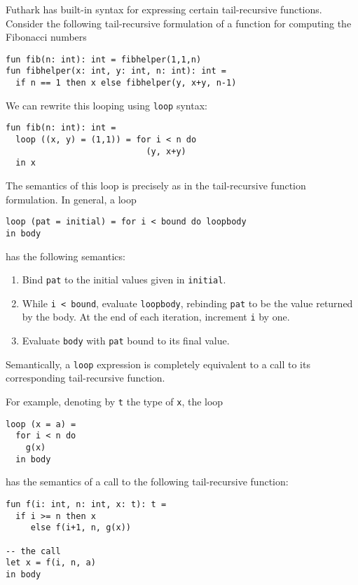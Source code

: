 \documentclass[oneside,11pt]{book}
\begin{document}
Futhark has built-in syntax for expressing certain tail-recursive
functions.  Consider the following tail-recursive formulation of a
function for computing the Fibonacci numbers

\begin{lstlisting}
fun fib(n: int): int = fibhelper(1,1,n)
fun fibhelper(x: int, y: int, n: int): int =
  if n == 1 then x else fibhelper(y, x+y, n-1)
\end{lstlisting}

We can rewrite this looping using \texttt{loop} syntax:

\begin{lstlisting}
fun fib(n: int): int =
  loop ((x, y) = (1,1)) = for i < n do
                            (y, x+y)
  in x
\end{lstlisting}

The semantics of this loop is precisely as in the tail-recursive function
formulation.  In general, a loop

\begin{lstlisting}
loop (pat = initial) = for i < bound do loopbody
in body
\end{lstlisting}

\noindent
has the following semantics:

\begin{enumerate}
\item Bind \texttt{pat} to the initial values given in
  \texttt{initial}.
\item While \texttt{i < bound}, evaluate \texttt{loopbody}, rebinding
  \texttt{pat} to be the value returned by the body.  At the end of
  each iteration, increment \texttt{i} by one.
\item Evaluate \texttt{body} with \texttt{pat} bound to its final
  value.
\end{enumerate}

Semantically, a \texttt{loop} expression is completely equivalent to a
call to its corresponding tail-recursive function.

For example, denoting by \texttt{t} the type of \texttt{x}, the
loop

\begin{lstlisting}
loop (x = a) =
  for i < n do
    g(x)
  in body
\end{lstlisting}

\noindent
has the semantics of a call to the following tail-recursive function:

\begin{lstlisting}
fun f(i: int, n: int, x: t): t =
  if i >= n then x
     else f(i+1, n, g(x))

-- the call
let x = f(i, n, a)
in body
\end{lstlisting}
\end{document}
